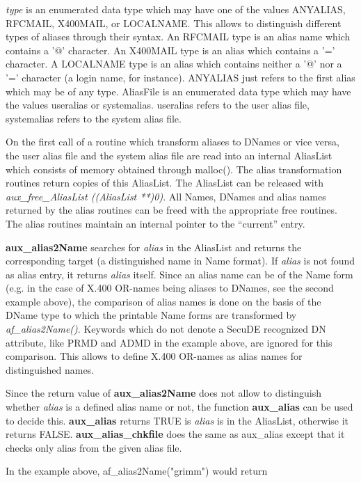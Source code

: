 {\em type} is an enumerated data type which may have one
of the values ANYALIAS, RFCMAIL, X400MAIL, or LOCALNAME. This allows to distinguish
different types of aliases through their syntax. An RFCMAIL type is an alias name which
contains a '@' character. An X400MAIL type is an alias which contains a '=' character.
A LOCALNAME type is an alias which contains neither a '@' nor a '=' character (a login
name, for instance).
ANYALIAS just refers to the first alias which may be of any type.
AliasFile is an enumerated data type which may have the values useralias
or systemalias. useralias refers to the user alias file, systemalias refers
to the system alias file.

On the first call of a routine which transform aliases to DNames or vice versa, the user 
alias file and the system alias file are read into an internal AliasList which
consists of memory obtained through malloc(). The alias transformation
routines return copies of this AliasList. The AliasList can be released
with {\em aux\_free\_AliasList ((AliasList **)0)}. All Names, DNames and alias names returned by 
the alias routines can be freed with the appropriate free routines. The alias routines 
maintain an internal pointer to the ``current'' entry.  

{\bf aux\_alias2Name} searches for {\em alias} in the AliasList
and returns the corresponding target
(a distinguished name in Name format). If {\em alias}
is not found as alias entry, it returns {\em alias} itself. Since an alias name can be
of the Name form (e.g. in the case of X.400 OR-names being aliases to DNames, see the second 
example above), the comparison of alias names is done on the basis of the DName type to which
the printable Name forms are transformed by {\em af\_alias2Name()}.
Keywords which do not
denote a SecuDE recognized DN attribute, like PRMD and ADMD in the example above,
are ignored for this comparison. This allows to define X.400 OR-names as alias names
for distinguished names.

Since the return value of {\bf aux\_alias2Name} does not allow to distinguish whether
{\em alias} is a defined alias name or not, the function {\bf aux\_alias} can be
used to decide this. {\bf aux\_alias} returns TRUE is {\em alias} is in the AliasList,
otherwise it returns FALSE. {\bf aux\_alias\_chkfile} does the same as aux\_alias
except that it checks only alias from the given alias file.

In the example above, af\_alias2Name("grimm") would return 

